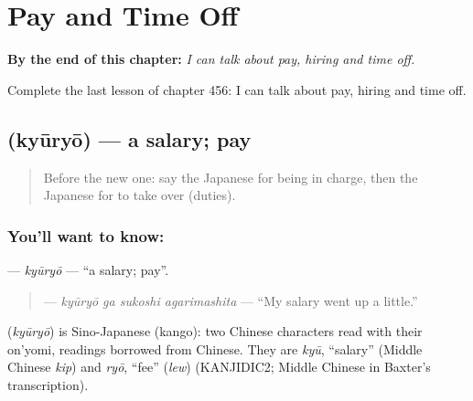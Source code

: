 
\chapter{Pay and Time Off}
\label{ch:ja-pay-and-time-off}

\begin{chapteropening}
\textbf{By the end of this chapter:} \emph{I can talk about pay, hiring and time off.}

Complete the last lesson of chapter 456: I can talk about pay, hiring and time off.
\end{chapteropening}

\section[\texorpdfstring{\ja{きゅうりょう} (kyūryō)}{きゅうりょう (kyūryō)}]{ (kyūryō) — a salary; pay}

\label{lesson:JA-C456-kyuuryou}



\begin{quote}
Before the new one: say the Japanese for being in charge, then the Japanese for to take over (duties).
\end{quote}

\subsection*{You'll want to know: }
\textbf{} — \emph{kyūryō} — \textquotedblleft{}a salary; pay\textquotedblright{}.

\begin{quote}
\textbf{  } — \emph{kyūryō ga sukoshi agarimashita} — \textquotedblleft{}My salary went up a little.\textquotedblright{}
\end{quote}

\begin{cousinweb}
\textbf{} (\emph{kyūryō}) is Sino-Japanese (kango): two Chinese characters read with their on'yomi, readings borrowed from Chinese. They are \emph{kyū}, \textquotedblleft{}salary\textquotedblright{} (Middle Chinese \emph{kip}) and \emph{ryō}, \textquotedblleft{}fee\textquotedblright{} (\emph{lew}) (KANJIDIC2; Middle Chinese in Baxter's transcription).
\end{cousinweb}

